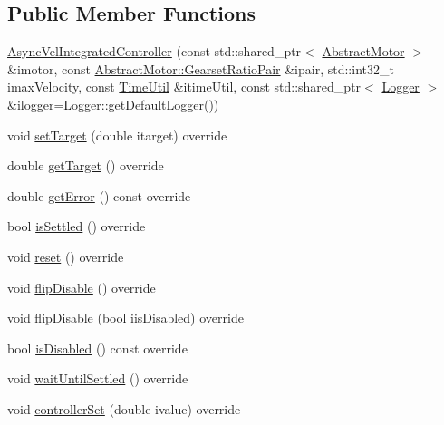 \subsection*{Public Member Functions}
\begin{DoxyCompactItemize}
\item 
\mbox{\hyperlink{classokapi_1_1AsyncVelIntegratedController_a8b272566332633b02aca9c8ea585e8f9}{Async\+Vel\+Integrated\+Controller}} (const std\+::shared\+\_\+ptr$<$ \mbox{\hyperlink{classokapi_1_1AbstractMotor}{Abstract\+Motor}} $>$ \&imotor, const \mbox{\hyperlink{structokapi_1_1AbstractMotor_1_1GearsetRatioPair}{Abstract\+Motor\+::\+Gearset\+Ratio\+Pair}} \&ipair, std\+::int32\+\_\+t imax\+Velocity, const \mbox{\hyperlink{classokapi_1_1TimeUtil}{Time\+Util}} \&itime\+Util, const std\+::shared\+\_\+ptr$<$ \mbox{\hyperlink{classokapi_1_1Logger}{Logger}} $>$ \&ilogger=\mbox{\hyperlink{classokapi_1_1Logger_a5053cf778b4b55acba788a3797dc96d2}{Logger\+::get\+Default\+Logger}}())
\item 
void \mbox{\hyperlink{classokapi_1_1AsyncVelIntegratedController_a5f1444ba57a64a21bfbdbdc57a264c2d}{set\+Target}} (double itarget) override
\item 
double \mbox{\hyperlink{classokapi_1_1AsyncVelIntegratedController_a030ca47508587f799dfdd7d97ed86d7d}{get\+Target}} () override
\item 
double \mbox{\hyperlink{classokapi_1_1AsyncVelIntegratedController_a6641352cebd3f0baa4e3e1ab4ad27be3}{get\+Error}} () const override
\item 
bool \mbox{\hyperlink{classokapi_1_1AsyncVelIntegratedController_a8518d706827ccc8d42d0a401566d58f7}{is\+Settled}} () override
\item 
void \mbox{\hyperlink{classokapi_1_1AsyncVelIntegratedController_aef78a032062241ece030d58407179912}{reset}} () override
\item 
void \mbox{\hyperlink{classokapi_1_1AsyncVelIntegratedController_ab75c1617544e0817949df5998fa2a8d7}{flip\+Disable}} () override
\item 
void \mbox{\hyperlink{classokapi_1_1AsyncVelIntegratedController_a1e906e904500fe920ea4cad6a922b523}{flip\+Disable}} (bool iis\+Disabled) override
\item 
bool \mbox{\hyperlink{classokapi_1_1AsyncVelIntegratedController_ad4c6394b3512ae44ffa36c9e01f6321b}{is\+Disabled}} () const override
\item 
void \mbox{\hyperlink{classokapi_1_1AsyncVelIntegratedController_aa1a838d836496ca5565c1d8379c2897a}{wait\+Until\+Settled}} () override
\item 
void \mbox{\hyperlink{classokapi_1_1AsyncVelIntegratedController_ae50c09f44077284278e4d8a80656077d}{controller\+Set}} (double ivalue) override
\end{DoxyCompactItemize}
